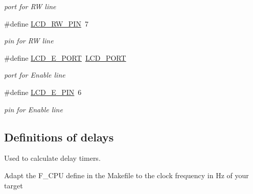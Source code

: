 \begin{DoxyCompactItemize}
\begin{DoxyCompactList}\small\item\em port for RW line \end{DoxyCompactList}\item 
\#define \hyperlink{group__pfleury__lcd_ga3ac938dd5fc02a9a232df6605b5f6aa8}{L\+C\+D\+\_\+\+R\+W\+\_\+\+P\+IN}~7\hypertarget{group__pfleury__lcd_ga3ac938dd5fc02a9a232df6605b5f6aa8}{}\label{group__pfleury__lcd_ga3ac938dd5fc02a9a232df6605b5f6aa8}

\begin{DoxyCompactList}\small\item\em pin for RW line \end{DoxyCompactList}\item 
\#define \hyperlink{group__pfleury__lcd_gaf97f97ff3832d1289bbcb471090ea297}{L\+C\+D\+\_\+\+E\+\_\+\+P\+O\+RT}~\hyperlink{group__pfleury__lcd_gabcf42bd88b3c36193f301ca25b033875}{L\+C\+D\+\_\+\+P\+O\+RT}\hypertarget{group__pfleury__lcd_gaf97f97ff3832d1289bbcb471090ea297}{}\label{group__pfleury__lcd_gaf97f97ff3832d1289bbcb471090ea297}

\begin{DoxyCompactList}\small\item\em port for Enable line \end{DoxyCompactList}\item 
\#define \hyperlink{group__pfleury__lcd_gae644d776392a8d47899d9910c2b8feb6}{L\+C\+D\+\_\+\+E\+\_\+\+P\+IN}~6\hypertarget{group__pfleury__lcd_gae644d776392a8d47899d9910c2b8feb6}{}\label{group__pfleury__lcd_gae644d776392a8d47899d9910c2b8feb6}

\begin{DoxyCompactList}\small\item\em pin for Enable line \end{DoxyCompactList}\end{DoxyCompactItemize}
\subsection*{Definitions of delays}
\label{_amgrp73324fc181df7d63636f86a5b76e74f2}%
Used to calculate delay timers.

Adapt the F\+\_\+\+C\+PU define in the Makefile to the clock frequency in Hz of your target

